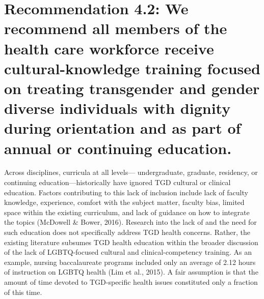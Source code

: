 \documentclass[
]{book}
\begin{document}
\hypertarget{recommendation-4.2-we-recommend-all-members-of-the-health-care-workforce-receive-cultural-knowledge-training-focused-on-treating-transgender-and-gender-diverse-individuals-with-dignity-during-orientation-and-as-part-of-annual-or-continuing-education.}{%
\section*{Recommendation 4.2: We recommend all members of the health care workforce receive cultural-knowledge training focused on treating transgender and gender diverse individuals with dignity during orientation and as part of annual or continuing education.}\label{recommendation-4.2-we-recommend-all-members-of-the-health-care-workforce-receive-cultural-knowledge-training-focused-on-treating-transgender-and-gender-diverse-individuals-with-dignity-during-orientation-and-as-part-of-annual-or-continuing-education.}}

Across disciplines, curricula at all levels---
undergraduate, graduate, residency, or continuing
education---historically have ignored TGD cultural or clinical education. Factors contributing
to this lack of inclusion include lack of faculty
knowledge, experience, comfort with the subject
matter, faculty bias, limited space within the
existing curriculum, and lack of guidance on how
to integrate the topics (McDowell \& Bower, 2016).
Research into the lack of and the need for such
education does not specifically address TGD
health concerns. Rather, the existing literature
subsumes TGD health education within the
broader discussion of the lack of LGBTQ-focused
cultural and clinical-competency training. As an
example, nursing baccalaureate programs included
only an average of 2.12 hours of instruction on
LGBTQ health (Lim et al., 2015). A fair assumption is that the amount of time devoted to
TGD-specific health issues constituted only a
fraction of this time.
\end{document}
